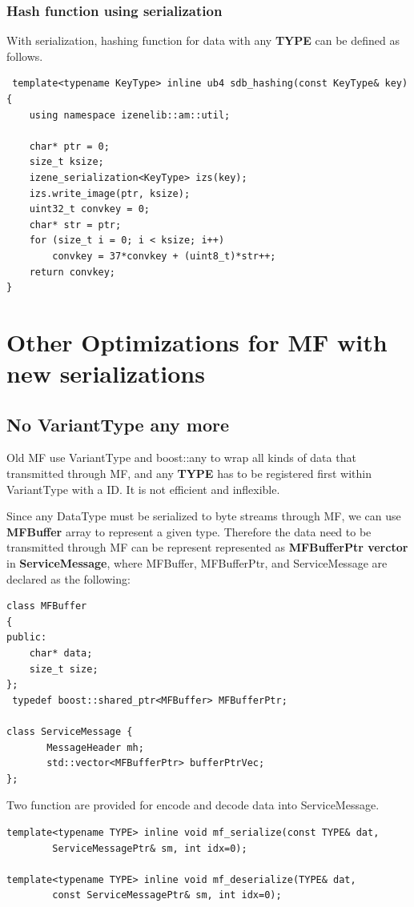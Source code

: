 \documentclass[a4paper,10pt]{article}
\begin{document}
\subsubsection{Hash function using serialization}
With serialization, hashing function for data with any \textbf{TYPE}
can be defined as follows.
\begin{lstlisting}
 template<typename KeyType> inline ub4 sdb_hashing(const KeyType& key) {
    using namespace izenelib::am::util;

    char* ptr = 0;
    size_t ksize;
    izene_serialization<KeyType> izs(key);
    izs.write_image(ptr, ksize);
    uint32_t convkey = 0;
    char* str = ptr;
    for (size_t i = 0; i < ksize; i++)
        convkey = 37*convkey + (uint8_t)*str++;
    return convkey;
}
\end{lstlisting}


\section{Other Optimizations for MF with new serializations}

\subsection{No VariantType any more}
Old MF use VariantType and boost::any to wrap all kinds of data that
transmitted through MF, and any \textbf{TYPE} has to be registered
first within VariantType with a ID. It is not efficient and
inflexible.


Since any DataType must be serialized to byte streams through MF, we
can use \textbf{MFBuffer} array to represent a given type. Therefore
the data need to be transmitted through MF can be represent
represented as \textbf{MFBufferPtr verctor} in
\textbf{ServiceMessage}, where MFBuffer, MFBufferPtr, and
ServiceMessage are declared as the following: 
\begin{lstlisting}
class MFBuffer
{
public:
    char* data;
    size_t size;
};
 typedef boost::shared_ptr<MFBuffer> MFBufferPtr;

class ServiceMessage {
       MessageHeader mh;
       std::vector<MFBufferPtr> bufferPtrVec;
};

\end{lstlisting}


Two function are provided for encode and decode data into ServiceMessage.
\begin{lstlisting}
template<typename TYPE> inline void mf_serialize(const TYPE& dat,
        ServiceMessagePtr& sm, int idx=0);

template<typename TYPE> inline void mf_deserialize(TYPE& dat,
        const ServiceMessagePtr& sm, int idx=0);

\end{lstlisting}
\end{document}
